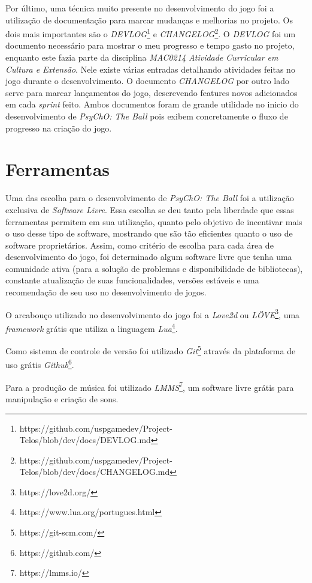 Por último, uma técnica muito presente no desenvolvimento do jogo foi a utilização de documentação para marcar mudanças e melhorias no projeto. Os dois mais importantes são o \textit{DEVLOG}\footnote{https://github.com/uspgamedev/Project-Telos/blob/dev/docs/DEVLOG.md} e \textit{CHANGELOG}\footnote{https://github.com/uspgamedev/Project-Telos/blob/dev/docs/CHANGELOG.md}. O \textit{DEVLOG} foi um documento necessário para mostrar o meu progresso e tempo gasto no projeto, enquanto este fazia parte da disciplina \textit{MAC0214 Atividade Curricular em Cultura e Extensão}. Nele existe várias entradas detalhando atividades feitas no jogo durante o desenvolvimento. O documento \textit{CHANGELOG} por outro lado serve para marcar lançamentos do jogo, descrevendo features novos adicionados em cada \textit{sprint} feito. Ambos documentos foram de grande utilidade no inicio do desenvolvimento de \textit{PsyChO: The Ball} pois exibem concretamente o fluxo de progresso na criação do jogo.

\section{Ferramentas}
\label{sec:ferramentas}

Uma das escolha para o desenvolvimento de \textit{PsyChO: The Ball} foi a utilização exclusiva de \textit{Software Livre}. Essa escolha se deu tanto pela liberdade que essas ferramentas permitem em sua utilização, quanto pelo objetivo de incentivar mais o uso desse tipo de software, mostrando que são tão eficientes quanto o uso de software proprietários. Assim, como critério de escolha para cada área de desenvolvimento do jogo, foi determinado algum software livre que tenha uma comunidade ativa (para a solução de problemas e disponibilidade de bibliotecas), constante atualização de suas funcionalidades, versões estáveis e uma recomendação de seu uso no desenvolvimento de jogos.

O arcabouço utilizado no desenvolvimento do jogo foi a \textit{Love2d} ou \textit{LÖVE}\footnote{https://love2d.org/}, uma \textit{framework} grátis que utiliza a linguagem \textit{Lua}\footnote{https://www.lua.org/portugues.html}.

Como sistema de controle de versão foi utilizado \textit{Git}\footnote{https://git-scm.com/} através da plataforma de uso grátis \textit{Github}\footnote{https://github.com/}.

Para a produção de música foi utilizado \textit{LMMS}\footnote{https://lmms.io/}, um software livre grátis para manipulação e criação de sons.

